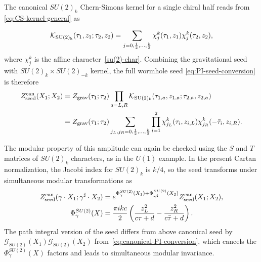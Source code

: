 \documentclass[11pt]{article}
\numberwithin{equation}{section}
\begin{document}
The canonical $SU(2)_k$ Chern-Simons kernel for a single chiral half reads from \eqref{eq:CS-kernel-general} as

\begin{equation}
\mathcal K_{\rm SU(2)_k}(\tau_1,z_1;\tau_2,z_2)
 =\sum_{j=0,\frac12,\ldots,\frac{k}{2}}
 \chi_j^k(\tau_1,z_1)\chi_j^k(\tau_2,z_2),
\label{su(2)_seed}
\end{equation}
where $\chi_j^k$ is the affine character~\eqref{su(2)-char}. 
Combining the gravitational seed with $SU(2)_k\times SU(2)_{-k}$ kernel, the full wormhole seed  \eqref{eq:PI-seed-conversion} is therefore
\begin{equation}
\begin{aligned}
 Z_{\rm seed}^{\mathrm{can}}(X_1;X_2)
 &=Z_{\rm grav}(\tau_1;\tau_2)
 \prod_{a=L,R}\mathcal K_{\rm SU(2)_k}
 (\tau_{1,a},z_{1,a};\tau_{2,a},z_{2,a})\\
 &=Z_{\rm grav}(\tau_1;\tau_2)
 \sum_{j_L,j_R=0,\frac12,\ldots,\frac{k}{2}}
 \prod_{i=1}^2\chi_{j_L}^k(\tau_i,z_{i,L})
                    \chi_{j_R}^k(-\bar\tau_i,z_{i,R}).
\end{aligned}
\label{eq:SU2-paired-seed}
\end{equation}

The modular property of this amplitude can again be checked using the $S$ and $T$ matrices of $SU(2)_k$ characters, as in the $U(1)$ example. In the present Cartan normalization, the Jacobi index for $SU(2)_k$ is $k/4$, so the seed transforms under simultaneous modular transformations as
\begin{equation}
\begin{aligned}
 Z_{\rm seed}^{\mathrm{can}}(\gamma\cdot X_1;\gamma^\sharp\cdot X_2)
 &=e^{\Phi^{SU(2)}_\gamma(X_1)+\Phi^{SU(2)}_{\gamma^\sharp}(X_2)}
 Z_{\rm seed}^{\mathrm{can}}(X_1;X_2), \\
  \Phi^{SU(2)}_\gamma(X)
 &=\frac{\pi i k c}{2}
 \left(\frac{z_L^2}{c\tau+d}-\frac{z_R^2}{c\bar\tau+d}\right).
\end{aligned}
\end{equation}
The path integral version of the seed differs from above canonical seed by  $\mathcal G_{SU(2)}(X_1)\mathcal G_{SU(2)}(X_2)$ from~\eqref{eq:canonical-PI-conversion}, which cancels the $\Phi^{SU(2)}_\gamma(X)$ factors and leads to simultaneous modular invariance.
\end{document}
